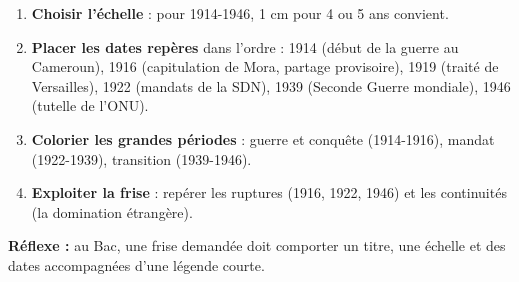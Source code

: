 \documentclass[11pt]{article}
\begin{document}
\begin{methode}
\begin{enumerate}
\item \textbf{Choisir l'échelle} : pour 1914-1946, 1 cm pour 4 ou 5 ans convient.
\item \textbf{Placer les dates repères} dans l'ordre : 1914 (début de la guerre au Cameroun), 1916 (capitulation de Mora, partage provisoire), 1919 (traité de Versailles), 1922 (mandats de la SDN), 1939 (Seconde Guerre mondiale), 1946 (tutelle de l'ONU).
\item \textbf{Colorier les grandes périodes} : guerre et conquête (1914-1916), mandat (1922-1939), transition (1939-1946).
\item \textbf{Exploiter la frise} : repérer les ruptures (1916, 1922, 1946) et les continuités (la domination étrangère).
\end{enumerate}
\textbf{Réflexe :} au Bac, une frise demandée doit comporter un titre, une échelle et des dates accompagnées d'une légende courte.
\end{methode}
\end{document}
